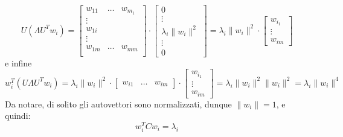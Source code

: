 \[
	U(\Lambda U^{T}w_i)=
	\begin{bmatrix}
		w_{11} & \ldots & w_{m_1} \\
		\vdots &        &         \\
		w_{1i} &        &         \\
		\vdots &        &         \\
		w_{1m} & \ldots & w_{mm}  \\
	\end{bmatrix}
	\cdot
	\begin{bmatrix}
		0                   \\
		\vdots              \\
		\lambda_i \|w_i\|^2 \\
		\vdots              \\
		0
	\end{bmatrix}
	=
	\lambda_i \|w_i\|^2 \cdot
	\begin{bmatrix}
		w_{i_1} \\
		\vdots  \\
		w_{im}
	\end{bmatrix}
\]
e infine
\[
	w_i^{T}(U\Lambda U^{T}w_i)=
	\lambda_i \|w_i\|^2 \cdot
	\begin{bmatrix}
		w_{i1} & \ldots & w_{im}
	\end{bmatrix}
	\cdot
	\begin{bmatrix}
		w_{i_1} \\
		\vdots  \\
		w_{im}
	\end{bmatrix}
	=
	\lambda_i \|w_i\|^2\|w_i\|^2 = \lambda_i \|w_i\|^4
\]
Da notare, di solito gli autovettori sono normalizzati, dunque $ \|w_i\| = 1 $, e quindi:
\[
	w_i^{T}Cw_i = \lambda_i
\]


